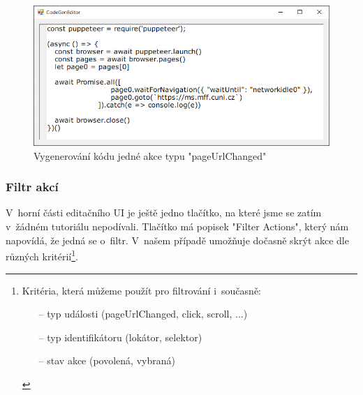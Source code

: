 \documentclass[12pt, a4paper, twoside]{article}
\begin{document}
	\begin{figure}[H]\ContinuedFloat
		\centering
		\includegraphics[width=1.0\textwidth]{pageUrlChangedCodeGen.png}
		\caption{Vygenerování kódu jedné akce typu "pageUrlChanged"}
	\end{figure}
	\subsubsection{Filtr akcí}
	V~horní části editačního UI je ještě jedno tlačítko, na které jsme se zatím v~žádném tutoriálu nepodívali. Tlačítko má popisek "Filter Actions", který nám napovídá, že jedná se o~filtr. V~našem případě umožňuje dočasně skrýt akce dle různých kritérií\footnote{Kritéria, která můžeme použít pro filtrování i~současně:
		\begin{itemize}[noitemsep, topsep=1pt]
			\item[--] typ události (pageUrlChanged, click, scroll, ...)
			\item[--] typ identifikátoru (lokátor, selektor)
			\item[--] stav akce (povolená, vybraná)
		\end{itemize} 
	}.
\end{document}

